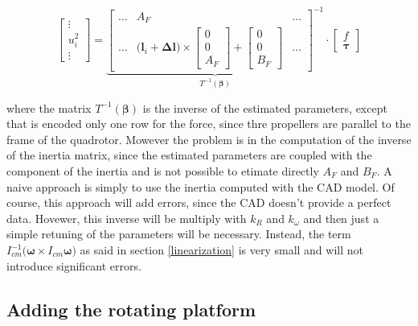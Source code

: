 \begin{equation}
	\begin{bmatrix}
		\vdots \\
		u_i^2 \\
		\vdots
	\end{bmatrix}
	=
	\underbrace{
	\begin{bmatrix}
		\dots   & A_F   & \dots  \\
		\dots & \Big(\mathbf{l}_i + \boldsymbol{\Delta l}\Big)\times\begin{bmatrix}0 \\ 0 \\ A_F \end{bmatrix}+\begin{bmatrix}0 \\ 0 \\ B_F\end{bmatrix} & \dots
	\end{bmatrix}^{-1}
	}_{T^{-1}(\boldsymbol{\beta})}	
	\cdot
	\begin{bmatrix}
		f \\
		\boldsymbol{\tau}
	\end{bmatrix}
	\label{eq:mixingMatrix}
\end{equation}

\noindent where the matrix $T^{-1}(\boldsymbol{\beta})$ is the inverse of the estimated parameters, except that is encoded only one row for the force, since thre propellers are parallel to the frame of the quadrotor. Mowever the problem is in the computation of the inverse of the inertia matrix, since the estimated parameters are coupled with the component of the inertia and is not possible to etimate directly $A_F$ and $B_F$. A naive approach is simply to use the inertia computed with the CAD model. Of course, this approach will add errors, since the CAD doesn't provide a perfect data. Hovewer, this inverse will be multiply with $k_R$ and $k_{\omega}$ and then just a simple retuning of the parameters will be necessary. Instead, the term $I_{cm}^{-1}\bigl(\boldsymbol{\omega}\times I_{cm}\boldsymbol{\omega}\bigl)$ as said in section \ref{linearization} is very small and will not introduce significant errors.


\subsection{Adding the rotating platform}

